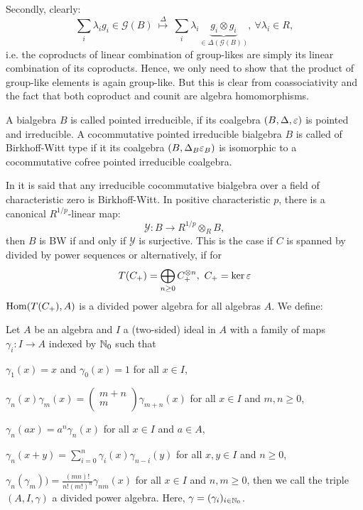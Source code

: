 Secondly, clearly:
$$\sum_i \lambda_i g_i \in \mathcal{G}(B)\ \stackrel{\Delta}{\longmapsto} \ \sum_i \lambda_i \underbrace{g_i \otimes g_i}_{\in \Delta(\mathcal{G}(B))},\ \forall \lambda_i \in R,$$
i.e. the coproducts of linear combination of group-likes are simply its linear combination of its coproducts. Hence, we only need to show that the product of group-like elements is again group-like. But this is clear from coassociativity and the fact that both coproduct and counit are algebra homomorphisms.
\begin{defi}
A bialgebra $B$ is called pointed irreducible, if its coalgebra $(B, \Delta, \varepsilon)$ is pointed and irreducible. A cocommutative pointed irreducible bialgebra $B$ is called of Birkhoff-Witt type if it its coalgebra $(B,\Delta_B\varepsilon_B)$ is isomorphic to a cocommutative cofree pointed irreducible coalgebra.
\end{defi}
\bmk In \cite{Take} it is said that any irreducible cocommutative bialgebra over a field of characteristic zero is Birkhoff-Witt. In positive characteristic $p$, there is a canonical $R^{1/p}$-linear map:
$$\mathcal{Y} : B \longrightarrow R^{1/p} \otimes_R B,$$
then $B$ is BW if and only if $\mathcal{Y}$ is surjective. This is the case if $C$ is spanned by divided by power sequences or alternatively, if for
$$T(C_+) = \bigoplus_{n \geq 0} C_+^{\otimes n},\ C_+ = \ker \eps$$
$\mathrm{Hom}(T(C_+), A)$ is a divided power algebra for all algebras $A$. We define:
\begin{defi}
Let $A$ be an algebra and $I$ a (two-sided) ideal in $A$ with a family of maps $\gamma_i : I \longrightarrow A$ indexed by $\mathbb{N}_0$ such that
\bn
\item $\gamma_1(x) = x$ and $\gamma_0(x) = 1$ for all $x \in I$,
\item $\gamma_n(x) \gamma_m(x) = \left(\begin{array}{c}m + n\\m\\\end{array}\right) \gamma_{m + n} (x)$ for all $x \in I$ and $m, n \geq 0$,
\item $\gamma_n(a x) = a^n \gamma_n(x)$ for all $x \in I$ and $a \in A$,
\item $\gamma_n(x + y) = \sum_{i = 0}^n \gamma_i(x) \gamma_{n - i}(y)$ for all $x, y \in I$ and $n \geq 0$,
\item $\gamma_n(\gamma_m)) = \frac{(m n)!}{n! (m!)^n} \gamma_{n m}(x)$ for all $x \in I$ and $n, m \geq 0$,
\en
then we call the triple $(A, I, \gamma)$ a divided power algebra. Here, $\gamma = (\gamma_i)_{i \in \mathbb{N}_0}$.
\end{defi}
